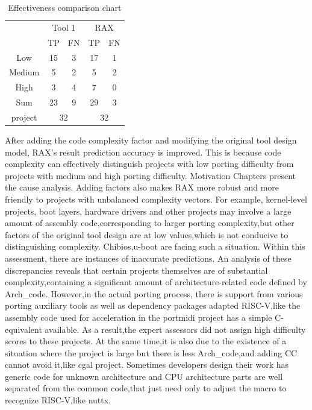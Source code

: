 \documentclass[sigconf,screen,review]{acmart}
\begin{document}
\begin{table}
  \caption{Effectiveness comparison chart}
  \label{tab:effectiveness}
  \begin{tabular}{ccccc}
    \toprule
     & \multicolumn{2}{c}{Tool 1} & \multicolumn{2}{c}{RAX} \\
     & TP & FN & TP & FN \\
    \midrule
    Low & 15 & 3 & 17 & 1 \\
    Medium & 5 & 2 & 5 & 2 \\
    High & 3 & 4 & 7 & 0 \\
    Sum & 23 & 9 & 29 & 3 \\
    project & \multicolumn{2}{c}{32} & \multicolumn{2}{c}{32} \\
  \bottomrule
\end{tabular}
\end{table}

After adding the code complexity factor and modifying the original tool design model, RAX's result prediction accuracy is improved.
This is because code complexity can effectively distinguish projects with low porting difficulty from projects with medium and high porting difficulty.
Motivation Chapters present the cause analysis.
Adding factors also makes RAX more robust and more friendly to projects with unbalanced complexity vectors.
For example, kernel-level projects, boot layers, hardware drivers and other projects may involve a large amount of assembly code,corresponding to larger porting complexity,but other factors of the original tool design are at low values,which is not conducive to distinguishing complexity.
Chibios,u-boot are facing such a situation.
Within this assessment, there are instances of inaccurate predictions.
An analysis of these discrepancies reveals that certain projects themselves are of substantial complexity,containing a significant amount of architecture-related code defined by Arch\_code.
However,in the actual porting process, there is support from various porting auxiliary tools as well as dependency packages adapted RISC-V,like the assembly code used for acceleration in the portmidi project has a simple C- equivalent available.
As a result,the expert assessors did not assign high difficulty scores to these projects.
At the same time,it is also due to the existence of a situation where the project is large but there is less Arch\_code,and adding CC cannot avoid it,like cgal project.
Sometimes developers design their work has generic code for unknown architecture and CPU architecture parts are well separated from the common code,that just need only to adjust the macro to recognize RISC-V,like nuttx.
\end{document}
